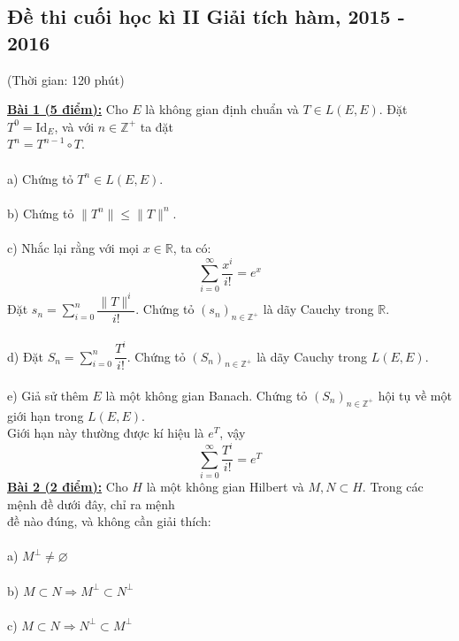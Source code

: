\documentclass[10pt, a4paper]{article}
\begin{document}
\subsection{Đề thi cuối học kì II Giải tích hàm, 2015 - 2016}
\begin{center}
	\color{blue}(Thời gian: 120 phút)
\end{center}
\color{red}\underline{\textbf{Bài 1 (5 điểm):}} \color{black}Cho $E$ là không gian định chuẩn và $T\in L(E,E)$. Đặt $T^0=\text{Id}_E$, và với $n\in\mathbb Z^+$ ta đặt\\ $T^n=T^{n-1}\circ T$.\\\\
\color{red}a) \color{black}Chứng tỏ $T^n\in L(E,E)$.\\\\
\color{red}b) \color{black}Chứng tỏ $\lVert T^n\rVert\le\lVert T\rVert^n$.\\\\
\color{red}c) \color{black}Nhắc lại rằng với mọi $x\in\mathbb R$, ta có: $$\displaystyle\sum_{i=0}^\infty\dfrac{x^i}{i!}=e^x$$
Đặt $s_n=\displaystyle\sum_{i=0}^n\dfrac{\lVert T\rVert^i}{i!}$. Chứng tỏ $(s_n)_{n\in\mathbb Z^+}$ là dãy Cauchy trong $\mathbb R$.\\\\
\color{red}d) \color{black}Đặt $S_n=\displaystyle\sum_{i=0}^n\dfrac{T^i}{i!}$. Chứng tỏ $(S_n)_{n\in\mathbb Z^+}$ là dãy Cauchy trong $L(E,E)$.\\\\
\color{red}e) \color{black}Giả sử thêm $E$ là một không gian Banach. Chứng tỏ $(S_n)_{n\in\mathbb Z^+}$ hội tụ về một giới hạn trong $L(E,E)$.\\ Giới hạn này thường được kí hiệu là $e^T$, vậy $$\displaystyle\sum_{i=0}^\infty\dfrac{T^i}{i!}=e^T$$
\color{red}\underline{\textbf{Bài 2 (2 điểm):}} \color{black}Cho $H$ là một không gian Hilbert và $M,N\subset H$. Trong các mệnh đề dưới đây, chỉ ra mệnh\\ đề nào đúng, và không cần giải thích:\\\\
\color{red}a) \color{black}$M^\perp\ne\varnothing$\\\\
\color{red}b) \color{black}$M\subset N\Rightarrow M^\perp\subset N^\perp$\\\\
\color{red}c) \color{black}$M\subset N\Rightarrow N^\perp\subset M^\perp$\\\\
\end{document}
